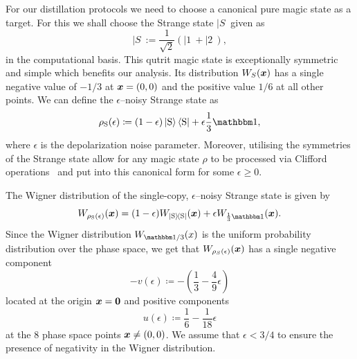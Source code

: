 \documentclass[pra,
aps,
twocolumn,
superscriptaddress,
groupedaddress,
nofootinbib,
reprint
]{revtex4-1}
\begin{document}
For our distillation protocols we need to choose a canonical pure magic state as a target. For this we shall choose the Strange state $|S\>$ given as
\begin{equation}
|S\> := \frac{1}{\sqrt{2}} (|1\> + |2\>),
\end{equation}
in the computational basis. This qutrit magic state is exceptionally symmetric and simple which benefits our analysis. Its distribution $W_S(\boldsymbol{x})$ has a single negative value of $-1/3$ at $\boldsymbol{x} =(0,0)$ and the positive value $1/6$ at all other points. We can define the $\epsilon$--noisy Strange state as
\begin{equation}\label{eq:noisysn}
    \rho_{\rm{S}}(\epsilon)\coloneqq (1 - \epsilon) \ket{\rm{S}}\bra{\rm{S}} + \epsilon \frac{1}{3}\id,
\end{equation}
where $\epsilon$ is the depolarization noise parameter. Moreover, utilising the symmetries of the Strange state allow for any magic state $\rho$ to be processed via Clifford operations~\cite{cit:prakash,cit:prakash2} and put into this canonical form for some $\epsilon \ge 0$.

The Wigner distribution of the single-copy, $\epsilon$--noisy Strange state  is given by
\begin{equation}
	\W[\bmx]{\rho_{\rm{S}}(\epsilon)} = (1-\epsilon)\W[\bmx]{\ketbra{\rm{S}}} + \epsilon\W[\bmx]{\frac{1}{3}\id}.
\end{equation}
Since the Wigner distribution $W_{\I/3}(x)$ is the uniform probability distribution over the phase space, we get that $W_{\rho_S(\epsilon) } (\boldsymbol{x})$ has a single negative component
\begin{equation}
	- v(\epsilon) \coloneqq - \left( \frac{1}{3} -\frac{4}{9}\epsilon \right)
\end{equation} 
located at the origin $\bm{x} = \bm{0}$ and positive components
\begin{equation}
	u(\epsilon) \coloneqq \frac{1}{6} -\frac{1}{18}\epsilon
\end{equation}
at the 8 phase space points $\boldsymbol{x} \ne (0,0)$. We assume that $\epsilon < 3/4$ to ensure the presence of negativity in the Wigner distribution. 
\end{document}
